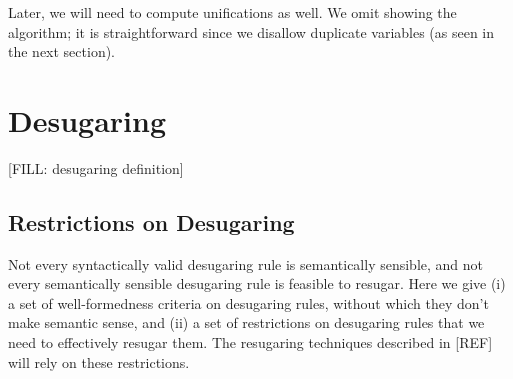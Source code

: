 
Later, we will need to compute unifications as well. We omit showing the
algorithm; it is straightforward since we disallow duplicate variables (as
seen in the next section).



\section{Desugaring}\label{sec:formal-desugar}

[FILL: desugaring definition]


\subsection{Restrictions on Desugaring}\label{sec:formal-reqs}

Not every syntactically valid desugaring rule is semantically
sensible, and not every semantically sensible desugaring rule is
feasible to resugar. Here we give (i) a set of well-formedness
criteria on desugaring rules, without which they don't make semantic
sense, and (ii) a set of restrictions on desugaring rules that we need
to effectively resugar them. The resugaring techniques described in
[REF] will rely on these restrictions.

